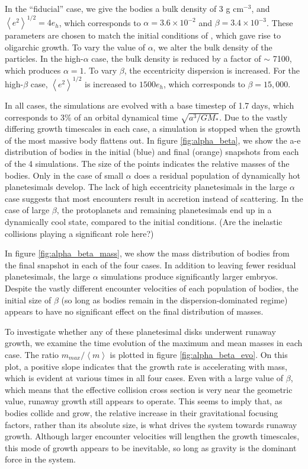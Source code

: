 \documentclass[twocolumn]{aastex63}
\begin{document}
In the ``fiducial'' case, we give the bodies a bulk density of 3 g
cm$^{-3}$, and $\left< e^{2} \right>^{1/2} = 4 e_{h}$, which corresponds to $\alpha = 3.6 \times 10^{-2}$ and $\beta = 3.4 \times 10^{-3}$. These parameters are chosen to match the initial conditions of \citet{kokubo98}, which gave rise to oligarchic growth. To vary the value of $\alpha$, we alter the bulk density of the particles. In the high-$\alpha$ case, the bulk density is reduced by a factor of $\sim$ 7100, which produces $\alpha = 1$. To vary $\beta$, the eccentricity dispersion is increased. For the high-$\beta$ case, $\left< e^{2} \right>^{1/2}$ is increased to $1500 e_{h}$, which corresponds to $\beta = 15,000$.

In all cases, the simulations are evolved with a base timestep of 1.7
days, which corresponds to 3\% of an orbital dynamical time
$\sqrt{a^3/G M_{*}}$. Due to the vastly differing growth timescales in
each case, a simulation is stopped when the growth of the most massive
body flattens out. In figure \ref{fig:alpha_beta}, we show the a-e
distribution of bodies in the initial (blue) and final (orange)
snapshots from each of the 4 simulations. The size of the points
indicates the relative masses of the bodies. Only in the case of small
$\alpha$ does a residual population of dynamically hot planetesimals
develop. The lack of high eccentricity planetesimals in the large
$\alpha$ case suggests that most encounters result in accretion
instead of scattering. In the case of large $\beta$, the protoplanets
and remaining planetesimals end up in a dynamically cool state,
compared to the initial conditions.
(Are the inelastic collisions playing a significant role here?)

In figure \ref{fig:alpha_beta_mass}, we show the mass distribution of bodies from the final snapshot in each of the four cases. In addition to leaving fewer residual planetesimals, the large $\alpha$ simulations produce significantly larger embryos. Despite the vastly different encounter velocities of each population of bodies, the initial size of $\beta$ (so long as bodies remain in the dispersion-dominated regime) appears to have no significant effect on the final distribution of masses.

To investigate whether any of these planetesimal disks underwent
runaway growth, we examine the time evolution of the maximum and mean
masses in each case. The ratio $m_{max}/\left< m \right>$ is plotted
in figure \ref{fig:alpha_beta_evo}. On this plot, a positive slope
indicates that the growth rate is accelerating with mass, which is
evident at various times in all four cases. Even with a large value of
$\beta$, which means that the effective collision cross section is
very near the geometric value, runaway growth still appears to
operate. This seems to imply that, as bodies collide and grow, the
relative increase in their gravitational focusing factors, rather than
its absolute size, is what drives the system towards runaway
growth. Although larger encounter velocities will lengthen the growth
timescales, this mode of growth appears to be inevitable, so long as
gravity is the dominant force in the system.
\end{document}
